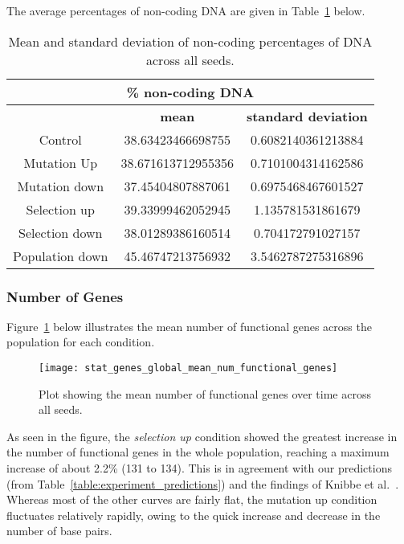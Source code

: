 The average percentages of non-coding DNA are given in Table~\ref{table:non-coding_DNA_mean_and_standard_deviation} below. 
\begin{table}[H]
	\begin{tabular}{|c|c|c|}
		\hline
		\multicolumn{3}{|c|}{\Large \textbf{\% non-coding DNA}} \\
		\hline
		& \textbf{mean} & \textbf{standard deviation} \\
		\hline \hline
		Control & 38.63423466698755	& 0.6082140361213884 \\
		\hline
		Mutation Up & 38.671613712955356 & 0.7101004314162586 \\
		\hline
		Mutation down & 37.45404807887061 & 0.6975468467601527 \\
		\hline
		Selection up & 39.33999462052945 & 1.135781531861679 \\
		\hline
		Selection down & 38.01289386160514 & 0.704172791027157 \\
		\hline
		Population down & 45.46747213756932 & 3.5462787275316896 \\
		\hline
	\end{tabular}
	\caption[Non-coding DNA mean and standard deviation]{Mean and standard deviation of non-coding percentages of DNA across all seeds.}
	\label{table:non-coding_DNA_mean_and_standard_deviation}
\end{table}

\subsubsection{Number of Genes}\label{sec:number_of_functional_genes}
Figure~\ref{fig:mean_num_functional_genes} below illustrates the mean number of functional genes across the population for each condition.  
\begin{figure}[H]
	\centering
	\texttt{[image: stat\_genes\_global\_mean\_num\_functional\_genes]}
	\caption[Mean number of functional genes]{Plot showing the mean number of functional genes over time across all seeds.}
	\label{fig:mean_num_functional_genes}
\end{figure}
As seen in the figure, the \textit{selection up} condition showed the greatest increase in the number of functional genes in the whole population, reaching a maximum increase of about 2.2\% (131 to 134). This is in agreement with our predictions (from Table~\ref{table:experiment_predictions}) and the findings of Knibbe et al.~\cite{Knibbe2007}. Whereas most of the other curves are fairly flat, the mutation up condition fluctuates relatively rapidly, owing to the quick increase and decrease in the number of base pairs. 

